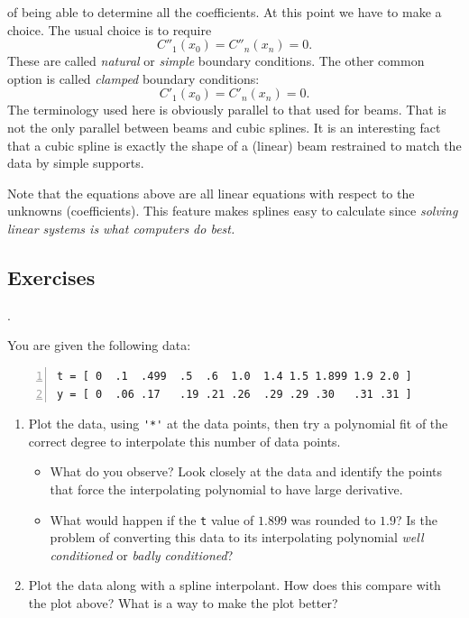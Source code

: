 of being able to determine all the coefficients. At this point we
have to make a choice. The usual choice is to require
\begin{equation*}
     C''_1(x_0) = C''_n(x_n) = 0.
\end{equation*}
These are called {\em natural} or {\em simple} boundary conditions.
The other common option is called {\em clamped} boundary conditions:
\begin{equation*}
     C'_1(x_0) = C'_n(x_n) = 0.
\end{equation*}
The terminology used here is obviously parallel to that used
for beams. That is not the only parallel between beams and
cubic splines. It is an interesting fact that a cubic spline is
exactly the shape of a (linear) beam restrained to match the
data by simple supports.

Note that the equations above are all linear equations
with respect to the unknowns (coefficients). This feature
makes splines easy to calculate since {\em solving linear systems is what
computers do best.}




\subsection*{Exercises}
\begin{list}
{.}{}

\item You are given the following data:
\begin{lstlisting}[frame=none,numbers=left]
t = [ 0  .1  .499  .5  .6  1.0  1.4 1.5 1.899 1.9 2.0 ]
y = [ 0  .06 .17   .19 .21 .26  .29 .29 .30   .31 .31 ]
\end{lstlisting}
\begin{enumerate}
\item[(a)] Plot the data, using \verb&'*'& at the data points, then try a polynomial fit of the correct degree
  to interpolate this number of data points. 
  \begin{itemize}
  	\item What do you observe?
  	Look closely at the data and identify the points that force the interpolating polynomial to have large derivative.
  	\item What would happen if the \verb*|t| value of $1.899$ was rounded to $1.9$?
  	Is the problem of converting this data to its interpolating polynomial {\em well conditioned} or {\em badly conditioned}?
  \end{itemize}
  
   
\item[(b)] Plot the data along with a spline interpolant.  How
  does this compare with the plot above?  What is a way to make the
  plot better?
\end{enumerate}
\end{list}

